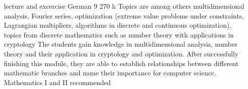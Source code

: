 {lecture and excercise}
{German}
{9}
{270 h}
{Topics are among others multidimensional analysis, Fourier series, optimization (extreme value problems under constraints, Lagrangian multipliers, algorithms in discrete and continuous optimization), topics from discrete mathematics such as number theory with applications in cryptology}
{The students gain knowledge in multidimensional analysis, number theory and their application in cryptology and optimization. After successfully finishing this module, they are able to establish relationships between different mathematic branches and name their importance for computer science.}
{Mathematics I and II recommended}